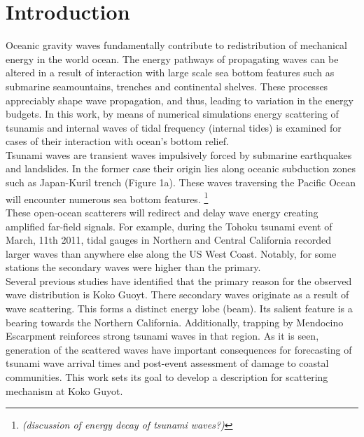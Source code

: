 \section{Introduction}
Oceanic gravity waves fundamentally contribute to redistribution of mechanical energy in the world ocean. The energy pathways of propagating waves can be altered in a result of interaction with large scale sea bottom features such as submarine seamountains, trenches and continental shelves. These processes appreciably shape wave propagation, and thus, leading to variation in the energy budgets. In this work, by means of numerical simulations  energy scattering of tsunamis and internal waves of tidal frequency (internal tides) is examined for cases of their interaction with ocean's bottom relief.\\
Tsunami waves are transient waves impulsively forced by submarine earthquakes and landslides. In the former case their origin lies along oceanic subduction zones such as Japan-Kuril trench (Figure 1a). These waves traversing the Pacific Ocean will encounter numerous sea bottom features. \footnote{\textit{(discussion of energy decay of tsunami waves?)}}\\
These open-ocean scatterers will redirect and delay wave energy creating amplified far-field signals. For example, during the Tohoku tsunami event of March, 11th 2011, tidal gauges in Northern and Central California recorded larger waves than anywhere else along the US West Coast. Notably, for some stations the secondary waves were higher than the primary.\\
Several previous studies have identified that the primary reason for the observed wave distribution is Koko Guoyt. There secondary waves originate as a result of wave scattering. This forms a distinct energy lobe (beam). Its salient feature is a bearing towards the Northern California. Additionally, trapping by Mendocino Escarpment reinforces strong tsunami waves in that region.  As it is seen, generation of the scattered waves have important consequences for forecasting of tsunami wave arrival times and post-event assessment of damage to coastal communities. This work sets its goal to develop a description for scattering mechanism at Koko Guyot.\\
